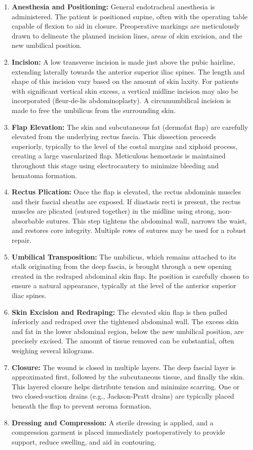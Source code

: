 \begin{enumerate}
  \item  \textbf{Anesthesia and Positioning:} General endotracheal anesthesia is administered. The patient is positioned supine, often with the operating table capable of flexion to aid in closure. Preoperative markings are meticulously drawn to delineate the planned incision lines, areas of skin excision, and the new umbilical position.
  \item  \textbf{Incision:} A low transverse incision is made just above the pubic hairline, extending laterally towards the anterior superior iliac spines. The length and shape of this incision vary based on the amount of skin laxity. For patients with significant vertical skin excess, a vertical midline incision may also be incorporated (fleur-de-lis abdominoplasty). A circumumbilical incision is made to free the umbilicus from the surrounding skin.
  \item  \textbf{Flap Elevation:} The skin and subcutaneous fat (dermofat flap) are carefully elevated from the underlying rectus fascia. This dissection proceeds superiorly, typically to the level of the costal margins and xiphoid process, creating a large vascularized flap. Meticulous hemostasis is maintained throughout this stage using electrocautery to minimize bleeding and hematoma formation.
  \item  \textbf{Rectus Plication:} Once the flap is elevated, the rectus abdominis muscles and their fascial sheaths are exposed. If diastasis recti is present, the rectus muscles are plicated (sutured together) in the midline using strong, non-absorbable sutures. This step tightens the abdominal wall, narrows the waist, and restores core integrity. Multiple rows of sutures may be used for a robust repair.
  \item  \textbf{Umbilical Transposition:} The umbilicus, which remains attached to its stalk originating from the deep fascia, is brought through a new opening created in the redraped abdominal skin flap. Its position is carefully chosen to ensure a natural appearance, typically at the level of the anterior superior iliac spines.
  \item  \textbf{Skin Excision and Redraping:} The elevated skin flap is then pulled inferiorly and redraped over the tightened abdominal wall. The excess skin and fat in the lower abdominal region, below the new umbilical position, are precisely excised. The amount of tissue removed can be substantial, often weighing several kilograms.
  \item  \textbf{Closure:} The wound is closed in multiple layers. The deep fascial layer is approximated first, followed by the subcutaneous tissue, and finally the skin. This layered closure helps distribute tension and minimize scarring. One or two closed-suction drains (e.g., Jackson-Pratt drains) are typically placed beneath the flap to prevent seroma formation.
  \item  \textbf{Dressing and Compression:} A sterile dressing is applied, and a compression garment is placed immediately postoperatively to provide support, reduce swelling, and aid in contouring.
\end{enumerate}

